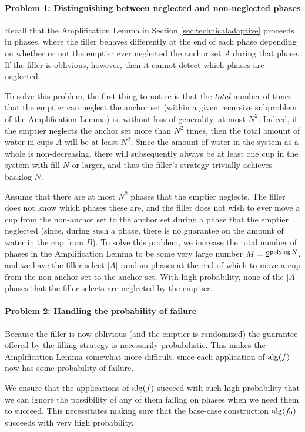 \paragraph{Problem 1: Distinguishing between neglected and non-neglected phases}
Recall that the Amplification Lemma in Section
\ref{sec:technicaladaptive} proceeds in phases, where the filler
behaves differently at the end of each phase depending on whether or
not the emptier ever neglected the anchor set $A$ during that
phase. If the filler is oblivious, however, then it cannot detect
which phases are neglected.

To solve this problem, the first thing to notice is that the
\emph{total} number of times that the emptier can neglect the anchor
set (within a given recursive subproblem of the Amplification Lemma)
is, without loss of generality, at most $N^2$. Indeed, if the emptier
neglects the anchor set more than $N^2$ times, then the total amount
of water in cups $A$ will be at least $N^2$. Since the amount of water
in the system as a whole is non-decreasing, there will subsequently
always be at least one cup in the system with fill $N$ or larger, and
thus the filler's strategy trivially achieves backlog $N$.

Assume that there are at most $N^2$ phases that the emptier
neglects. The filler does not know which phases these are, and
the filler does not wish to ever move a cup from the non-anchor
set to the anchor set during a phase that the emptier neglected
(since, during such a phase, there is no guarantee on the amount
of water in the cup from $B$). To solve this problem, we increase
the total number of phases in the Amplification Lemma to be some
very large number $M = 2^{\operatorname{\text{polylog}} N}$, and we have the filler
select $|A|$ random phases at the end of which to move a cup from
the non-anchor set to the anchor set. With high probability, none
of the $|A|$ phases that the filler selects are neglected by the
emptier.

\paragraph{Problem 2: Handling the probability of failure}
Because the filler is now oblivious (and the emptier is randomized)
the guarantee offered by the filling strategy is necessarily
probabilistic. This makes the Amplification Lemma somewhat more
difficult, since each application of $\operatorname{\text{\textup{alg}}}(f)$ now has some
probability of failure.

We ensure that the applications of $\operatorname{\text{\textup{alg}}}(f)$ succeed with such
high probability that we can ignore the possibility of any of
them failing on phases when we need them to succeed. This
necessitates making sure that the base-case construction
$\operatorname{\text{\textup{alg}}}(f_0)$ succeeds with very high probability.

